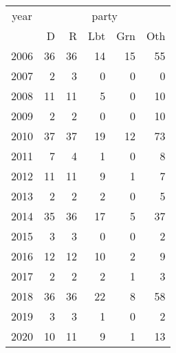 \footnotesize\begin{tabular}[t]{lrrrrr}
\toprule
\multicolumn{1}{c}{year} & \multicolumn{5}{c}{party} \\
\cmidrule(l{3pt}r{3pt}){1-1} \cmidrule(l{3pt}r{3pt}){2-6}
  & D & R & Lbt & Grn & Oth\\
\midrule
2006 & 36 & 36 & 14 & 15 & 55\\
2007 & 2 & 3 & 0 & 0 & 0\\
2008 & 11 & 11 & 5 & 0 & 10\\
2009 & 2 & 2 & 0 & 0 & 10\\
2010 & 37 & 37 & 19 & 12 & 73\\
2011 & 7 & 4 & 1 & 0 & 8\\
2012 & 11 & 11 & 9 & 1 & 7\\
2013 & 2 & 2 & 2 & 0 & 5\\
2014 & 35 & 36 & 17 & 5 & 37\\
2015 & 3 & 3 & 0 & 0 & 2\\
2016 & 12 & 12 & 10 & 2 & 9\\
2017 & 2 & 2 & 2 & 1 & 3\\
2018 & 36 & 36 & 22 & 8 & 58\\
2019 & 3 & 3 & 1 & 0 & 2\\
2020 & 10 & 11 & 9 & 1 & 13\\
\bottomrule
\end{tabular}
